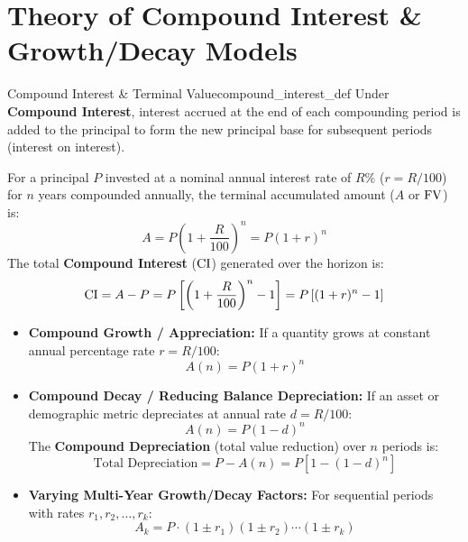 \section{Theory of Compound Interest \& Growth/Decay Models}

\begin{definition}{Compound Interest \& Terminal Value}{compound_interest_def}
Under \textbf{Compound Interest}, interest accrued at the end of each compounding period is added to the principal to form the new principal base for subsequent periods (interest on interest).

For a principal $P$ invested at a nominal annual interest rate of $R\%$ ($r = R/100$) for $n$ years compounded annually, the terminal accumulated amount ($A$ or $\operatorname{FV}$) is:
\begin{equation}
    A = P\left(1 + \frac{R}{100}\right)^n = P(1 + r)^n
\end{equation}
The total \textbf{Compound Interest} ($\operatorname{CI}$) generated over the horizon is:
\begin{equation}
    \operatorname{CI} = A - P = P\left[\left(1 + \frac{R}{100}\right)^n - 1\right] = P\left[(1 + r)^n - 1\right]
\end{equation}
\end{definition}

\begin{formulabox}
\begin{itemize}[leftmargin=*, noitemsep]
    \item \textbf{Compound Growth / Appreciation:} If a quantity grows at constant annual percentage rate $r = R/100$:
    \begin{equation}
        A(n) = P(1 + r)^n
    \end{equation}
    \item \textbf{Compound Decay / Reducing Balance Depreciation:} If an asset or demographic metric depreciates at annual rate $d = R/100$:
    \begin{equation}
        A(n) = P(1 - d)^n
    \end{equation}
    The \textbf{Compound Depreciation} (total value reduction) over $n$ periods is:
    \begin{equation}
        \text{Total Depreciation} = P - A(n) = P\left[1 - (1 - d)^n\right]
    \end{equation}
    \item \textbf{Varying Multi-Year Growth/Decay Factors:} For sequential periods with rates $r_1, r_2, \dots, r_k$:
    \begin{equation}
        A_k = P \cdot (1 \pm r_1)(1 \pm r_2)\cdots(1 \pm r_k)
    \end{equation}
\end{itemize}
\end{formulabox}

